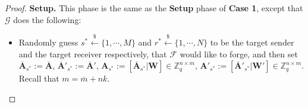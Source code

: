 \documentclass[a4paper,11pt,onecolumn]{elsarticle}
\def\bf{\mathbf}
\begin{document}
\begin{proof}
		 \textbf{Setup.}   This phase is the same as  the \textbf{Setup} phase of \textbf{Case 1}, except that $\mathcal{G}$ does the following:
				\begin{itemize}
				
				\item Randomly guess $s^* \xleftarrow{\$} \{1, \cdots, M\}$ and $r^* \xleftarrow{\$} \{1, \cdots, N\}$ to be the target sender and the target receiver respectively, that $\mathcal{F}$ would like to forge, and then set $\overline{\bf{A}}_{s^*}:=\overline{\bf{A}}$, $\overline{\bf{A}}'_{s^*}:=\overline{\bf{A}}'$,  $\mathbf{A}_{s^*}:=[\overline{\mathbf{A}}_{s^*}|\mathbf{W}] \in \mathbb{Z}_q^{n \times m}$, $\mathbf{A}'_{s^*}:=[\overline{\mathbf{A}}'_{s^*}|\mathbf{W}'] \in \mathbb{Z}_q^{n \times m}$. Recall  that $m=\overline{m}+nk.$
			
			

\end{itemize}
\end{proof}
\end{document}

